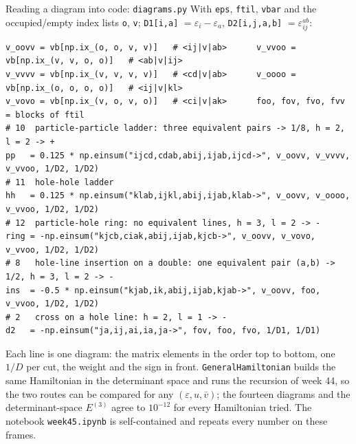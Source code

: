 \documentclass[aspectratio=169,10pt]{beamer}
\begin{document}
\begin{frame}[fragile,shrink=10]{Reading a diagram into code: \texttt{diagrams.py}}
With \texttt{eps}, \texttt{ftil}, \texttt{vbar} and the occupied/empty index lists \texttt{o}, \texttt{v}; \texttt{D1[i,a]} \(=\varepsilon_i-\varepsilon_a\), \texttt{D2[i,j,a,b]} \(=\varepsilon_{ij}^{ab}\):
\begin{lstlisting}
v_oovv = vb[np.ix_(o, o, v, v)]   # <ij|v|ab>      v_vvoo = vb[np.ix_(v, v, o, o)]   # <ab|v|ij>
v_vvvv = vb[np.ix_(v, v, v, v)]   # <cd|v|ab>      v_oooo = vb[np.ix_(o, o, o, o)]   # <ij|v|kl>
v_vovo = vb[np.ix_(v, o, v, o)]   # <ci|v|ak>      foo, fov, fvo, fvv = blocks of ftil
# 10  particle-particle ladder: three equivalent pairs -> 1/8, h = 2, l = 2 -> +
pp   = 0.125 * np.einsum("ijcd,cdab,abij,ijab,ijcd->", v_oovv, v_vvvv, v_vvoo, 1/D2, 1/D2)
# 11  hole-hole ladder
hh   = 0.125 * np.einsum("klab,ijkl,abij,ijab,klab->", v_oovv, v_oooo, v_vvoo, 1/D2, 1/D2)
# 12  particle-hole ring: no equivalent lines, h = 3, l = 2 -> -
ring = -np.einsum("kjcb,ciak,abij,ijab,kjcb->", v_oovv, v_vovo, v_vvoo, 1/D2, 1/D2)
# 8   hole-line insertion on a double: one equivalent pair (a,b) -> 1/2, h = 3, l = 2 -> -
ins  = -0.5 * np.einsum("kjab,ik,abij,ijab,kjab->", v_oovv, foo, v_vvoo, 1/D2, 1/D2)
# 2   cross on a hole line: h = 2, l = 1 -> -
d2   = -np.einsum("ja,ij,ai,ia,ja->", fov, foo, fvo, 1/D1, 1/D1)
\end{lstlisting}
\small Each line is one diagram: the matrix elements in the order top to bottom, one \(1/D\) per cut, the weight and the sign in front. \texttt{GeneralHamiltonian} builds the same Hamiltonian in the determinant space and runs the recursion of week 44, so the two routes can be compared for any \((\varepsilon,u,\bar v)\); the fourteen diagrams and the determinant-space \(E^{(3)}\) agree to \(10^{-12}\) for every Hamiltonian tried. The notebook \texttt{week45.ipynb} is self-contained and repeats every number on these frames.
\end{frame}
\end{document}
